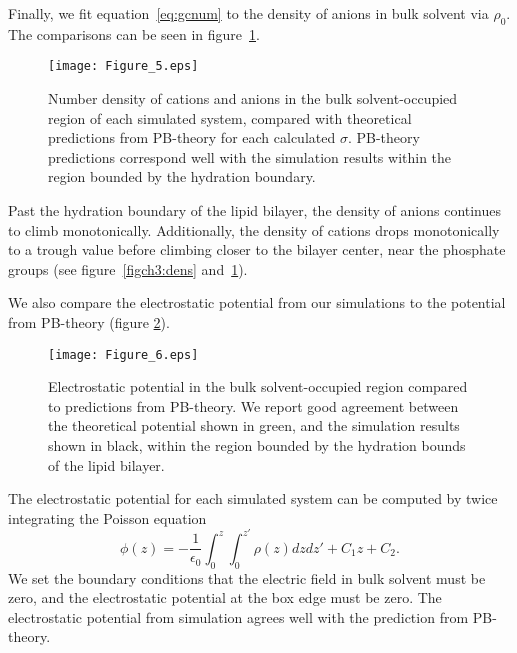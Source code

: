 Finally, we fit equation~\ref{eq:gcnum} to the density of anions in 
bulk solvent via $\rho_0$. The comparisons
can be seen in figure~\ref{figch3:catgcdens}.
\begin{figure}[H]
    \caption[Number densities of cations and anions]{Number density of cations and anions in the bulk solvent-occupied region of each
    simulated system, compared with theoretical predictions from PB-theory for each calculated $\sigma$. PB-theory predictions
    correspond well with the simulation results within the region bounded by the hydration boundary.}
    \label{figch3:catgcdens}
    \texttt{[image: Figure\_5.eps]}
\end{figure}
Past the hydration boundary of the lipid bilayer, the density of anions continues 
to climb monotonically. Additionally, the density of cations 
drops monotonically to a trough value before climbing closer to the bilayer center, near the phosphate groups 
(see figure~\ref{figch3:dens} and~\ref{figch3:catgcdens}). 


We also compare {the} 
electrostatic potential from our simulations 
to the potential from PB-theory 
(figure \ref{figch3:potgc}). 
\begin{figure}[H]
    \caption[Electrostatic potential]{Electrostatic potential in the bulk solvent-occupied region compared to predictions from PB-theory. We report good
    agreement between the theoretical potential shown in green, and the simulation results shown in black, within the region bounded by the hydration
    bounds of the lipid bilayer.}
    \label{figch3:potgc}
    \texttt{[image: Figure\_6.eps]}
\end{figure}
The electrostatic potential for each simulated system can be computed 
by twice integrating the Poisson equation 
\begin{equation}
    \phi(z)=-\frac{1}{\epsilon_0}\int_{0}^{z}\int_{0}^{z'}\rho(z) dz dz' + C_1z + C_2\text{.}
    \label{eq:poissonint}
\end{equation}
We set the boundary conditions that
the electric field in bulk solvent must be zero, and the electrostatic potential at the box edge must be zero.
The electrostatic potential from simulation agrees well with the prediction from PB-theory.


